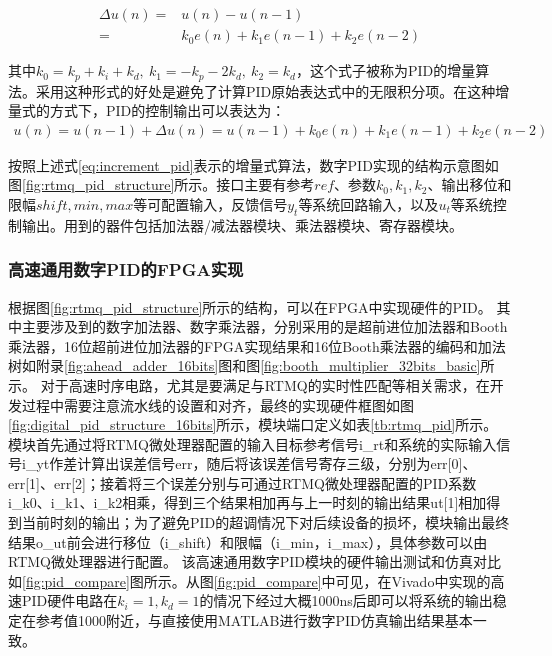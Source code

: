 \begin{align}
    \Delta u(n)=&u(n)-u(n-1)\\
    =&k_0 e(n)+k_1 e(n-1)+k_2 e(n-2)
\end{align}

其中$k_0=k_p+k_i+k_d,\ k_1=-k_p-2k_d,\ k_2=k_d$，这个式子被称为PID的增量算法。采用这种形式的好处是避免了计算PID原始表达式中的无限积分项。在这种增量式的方式下，PID的控制输出可以表达为：
\begin{align}
    u(n)=u(n-1)+\Delta u(n)=u(n-1)+k_0 e(n)+k_1 e(n-1)+k_2 e(n-2)\label{eq:increment_pid}
\end{align}

按照上述式\eqref{eq:increment_pid}表示的增量式算法，数字PID实现的结构示意图如图\ref{fig:rtmq_pid_structure}所示。接口主要有参考$ref$、参数$k_0, k_1, k_2$、输出移位和限幅$shift, min, max$等可配置输入，反馈信号$y_t$等系统回路输入，以及$u_t$等系统控制输出。用到的器件包括加法器/减法器模块、乘法器模块、寄存器模块。

\subsubsection[高速通用数字PID的FPGA实现]{高速通用数字PID的FPGA实现}


根据图\ref{fig:rtmq_pid_structure}所示的结构，可以在FPGA中实现硬件的PID。
其中主要涉及到的数字加法器、数字乘法器，分别采用的是超前进位加法器和Booth乘法器，16位超前进位加法器的FPGA实现结果和16位Booth乘法器的编码和加法树如附录\ref{fig:ahead_adder_16bits}图和图\ref{fig:booth_multiplier_32bits_basic}所示。
对于高速时序电路，尤其是要满足与RTMQ的实时性匹配等相关需求，在开发过程中需要注意流水线的设置和对齐，最终的实现硬件框图如图\ref{fig:digital_pid_structure_16bits}所示，模块端口定义如表\ref{tb:rtmq_pid}所示。
模块首先通过将RTMQ微处理器配置的输入目标参考信号i\_rt和系统的实际输入信号i\_yt作差计算出误差信号err，随后将该误差信号寄存三级，分别为err[0]、err[1]、err[2]；接着将三个误差分别与可通过RTMQ微处理器配置的PID系数i\_k0、i\_k1、i\_k2相乘，得到三个结果相加再与上一时刻的输出结果ut[1]相加得到当前时刻的输出；为了避免PID的超调情况下对后续设备的损坏，模块输出最终结果o\_ut前会进行移位（i\_shift）和限幅（i\_min，i\_max），具体参数可以由RTMQ微处理器进行配置。
该高速通用数字PID模块的硬件输出测试和仿真对比如\ref{fig:pid_compare}图所示。从图\ref{fig:pid_compare}中可见，在Vivado中实现的高速PID硬件电路在$k_i=1, k_d=1$的情况下经过大概1000ns后即可以将系统的输出稳定在参考值1000附近，与直接使用MATLAB进行数字PID仿真输出结果基本一致。

